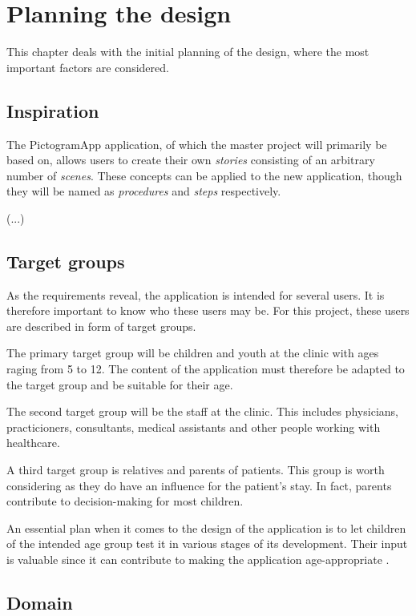 \chapter{Planning the design}
\label{ch:planning}

This chapter deals with the initial planning of the design, where the most important factors are considered.

\section{Inspiration}

The PictogramApp application, of which the master project will primarily be based on, allows users to create their own \emph{stories} consisting of an arbitrary number of \emph{scenes}. These concepts can be applied to the new application, though they will be named as \emph{procedures} and \emph{steps} respectively.

(...)

\section{Target groups}

As the requirements reveal, the application is intended for several users. It is therefore important to know who these users may be. For this project, these users are described in form of target groups.

The primary target group will be children and youth at the clinic with ages raging from 5 to 12. The content of the application must therefore be adapted to the target group and be suitable for their age.

The second target group will be the staff at the clinic. This includes physicians, practicioners, consultants, medical assistants and other people working with healthcare.

A third target group is relatives and parents of patients. This group is worth considering as they do have an influence for the patient's stay. In fact, parents contribute to decision-making for most children.

An essential plan when it comes to the design of the application is to let children of the intended age group test it in various stages of its development. Their input is valuable since it can contribute to making the application age-appropriate \autocite{stalberg2016}.

\section{Domain}

